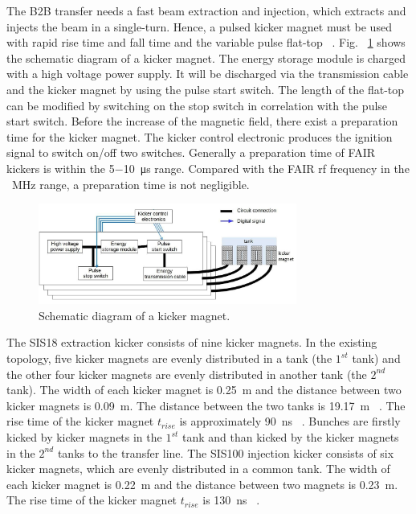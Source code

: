 The B2B transfer needs a fast beam extraction and injection, which extracts and injects the beam in a single-turn. Hence, a pulsed kicker magnet must be used with rapid rise time and fall time and the variable pulse flat-top ~\cite{petzenhauser_concept_2016}. Fig. ~\ref{SIS18_kicker} shows the schematic diagram of a kicker magnet. The energy storage module is charged with a high voltage power supply. It will be discharged via the transmission cable and the kicker magnet by using the pulse start switch. The length of the flat-top can be modified by switching on the stop switch in correlation with the pulse start switch. Before the increase of the magnetic field, there exist a preparation time for the kicker magnet. The kicker control electronic produces the ignition signal to switch on/off two switches. Generally a preparation time of FAIR kickers is within the \SI{5}{}$-$\SI{10}{\micro\second} range. Compared with the FAIR rf frequency in the \SI{}{MHz} range, a preparation time is not negligible.
\begin{figure}[!htb]
   \centering   
   \includegraphics*[width=85mm]{SIS18_kicker.jpg}
   \caption{Schematic diagram of a kicker magnet.}
   \label{SIS18_kicker}
\end{figure}


The SIS18 extraction kicker consists of nine kicker magnets. In the existing topology, five kicker magnets are evenly distributed in a tank (the $1^{st}$ tank) and the other four kicker magnets are evenly distributed in another tank (the $2^{nd}$ tank). The width of each kicker magnet is \SI{0.25}{m} and the distance between two kicker magnets is \SI{0.09}{m}. The distance between the two tanks is \SI{19.17}{m} ~\cite{ros_sis18_2008}. The rise time of the kicker magnet $t_\mathit{rise}$ is approximately \SI{90}{ns} ~\cite{blell_f-ds-ie-03e_2014}. Bunches are firstly kicked by kicker magnets in the $1^{st}$ tank and than kicked by the
kicker magnets in the $2^{nd}$ tanks to the transfer line. The SIS100 injection kicker consists of six kicker magnets, which are evenly distributed in a common tank. The width of each kicker magnet is \SI{0.22}{m} and the distance between two magnets is \SI{0.23}{m}. The rise time of the kicker magnet $t_\mathit{rise}$ is \SI{130}{ns} ~\cite{blell_f-ds-ie-03e_2014}. 

